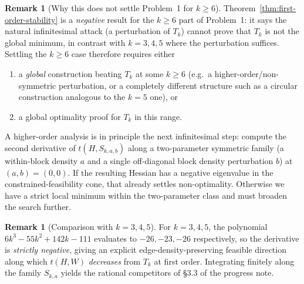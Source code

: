 \documentclass[11pt]{amsart}
\theoremstyle{definition}
\newtheorem{remark}[theorem]{Remark}
\newcommand{\1}{\mathbf 1}
\begin{document}
\begin{remark}[Why this does not settle Problem~1 for $k\ge 6$]
Theorem~\ref{thm:first-order-stability} is a \emph{negative} result for the
$k\ge 6$ part of Problem~1: it says the natural infinitesimal attack (a
perturbation of $T_k$) cannot prove that $T_k$ is not the global minimum, in
contrast with $k=3,4,5$ where the perturbation suffices.  Settling the $k\ge 6$
case therefore requires either
\begin{enumerate}[label=(\alph*)]
\item a \emph{global} construction beating $T_k$ at some $k\ge 6$ (e.g.\ a
   higher-order/non-symmetric perturbation, or a completely different
   structure such as a circular construction analogous to the $k=5$ one), or
\item a global optimality proof for $T_k$ in this range.
\end{enumerate}
A higher-order analysis is in principle the next infinitesimal step: compute
the second derivative of $t(H, S_{k,a,b})$ along a two-parameter symmetric
family (a within-block density $a$ and a single off-diagonal block density
perturbation $b$) at $(a,b)=(0,0)$.  If the resulting Hessian has a negative
eigenvalue in the constrained-feasibility cone, that already settles
non-optimality.  Otherwise we have a strict local minimum within the
two-parameter class and must broaden the search further.
\end{remark}

\begin{remark}[Comparison with $k=3,4,5$]
For $k=3,4,5$, the polynomial $6k^3-55k^2+142k-111$ evaluates to
$-26,-23,-26$ respectively, so the derivative is \emph{strictly negative},
giving an explicit edge-density-preserving feasible direction along which
$t(H,W)$ \emph{decreases} from $T_k$ at first order.  Integrating finitely
along the family $S_{k,a}$ yields the rational competitors of §3.3 of the
progress note.
\end{remark}
\end{document}
